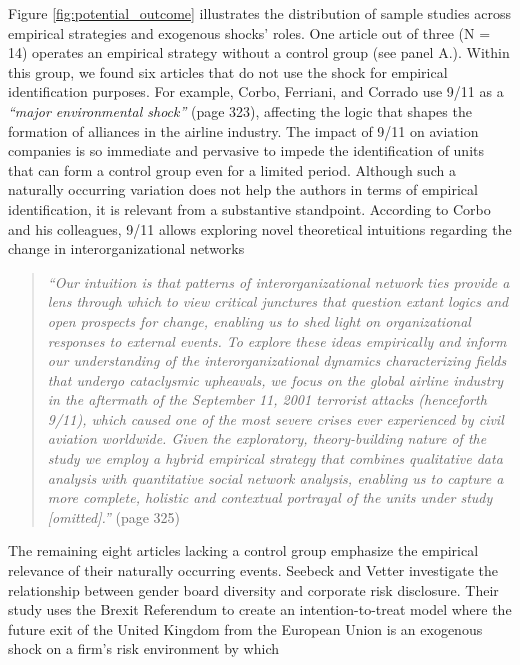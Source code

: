 \documentclass[11pt]{article}
\begin{document}
\begin{refsection}
Figure \ref{fig:potential_outcome} illustrates the distribution of sample studies across empirical strategies and exogenous shocks' roles. One article out of three (N = 14) operates an empirical strategy without a control group (see panel A.). Within this group, we found six articles that do not use the shock for empirical identification purposes. For example, Corbo, Ferriani, and Corrado \autocite*{corbo2016323} use 9/11 as a \textit{``major environmental shock''} (page 323), affecting the logic that shapes the formation of alliances in the airline industry. The impact of 9/11 on aviation companies is so immediate and pervasive to impede the identification of units that can form a control group even for a limited period.  Although such a naturally occurring variation does not help the authors in terms of empirical identification, it is relevant from a substantive standpoint. According to Corbo and his colleagues, 9/11 allows exploring novel theoretical intuitions regarding the change in interorganizational networks

\begin{quote}
  \textit{
    ``Our intuition is that patterns of interorganizational network ties provide
    a lens through which to view critical junctures that question extant logics
    and open prospects for change, enabling us to shed light on organizational
    responses to external events.  To explore these ideas empirically and inform
    our understanding of the interorganizational dynamics characterizing fields
    that undergo cataclysmic upheavals, we focus on the global airline industry
    in the aftermath of the September 11, 2001 terrorist attacks (henceforth
    9/11), which caused one of the most severe crises ever experienced by civil
    aviation worldwide. Given the exploratory, theory-building nature of the
    study we employ a hybrid empirical strategy that combines qualitative data
    analysis with quantitative social network analysis, enabling us to capture a
    more complete, holistic and contextual portrayal of the units under study
    [omitted].''
  }
  (page 325)
\end{quote}

The remaining eight articles lacking a control group emphasize the empirical relevance of their naturally occurring events. Seebeck and Vetter \autocite*{seebeck2021} investigate the relationship between gender board diversity and corporate risk disclosure.  Their study uses the Brexit Referendum to create an intention-to-treat model \autocite{angrist_1996} where the future exit of the United Kingdom from the European Union is an exogenous shock on a firm's risk environment by which


\end{refsection}
\end{document}
